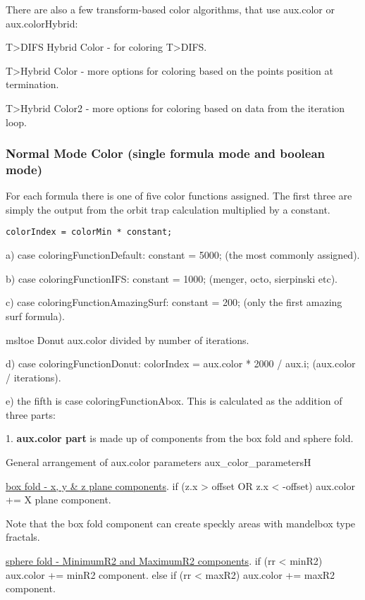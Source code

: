 There are also a few transform-based color algorithms, that use aux.color or aux.colorHybrid:

T>DIFS Hybrid Color - for coloring T>DIFS.

T>Hybrid Color - more options for coloring based on the points position at termination.

T>Hybrid Color2 - more options for coloring based on data from the iteration loop.

\subsubsection{Normal Mode Color (single formula mode and boolean mode)}\label{materials-normal-mode-color}

For each formula there is one of five color functions assigned. The first three are simply the output from the orbit trap calculation multiplied by a constant.

\begin{lstlisting}
colorIndex = colorMin * constant;
\end{lstlisting}
	

a) case coloringFunctionDefault: constant = 5000; (the most commonly assigned).

b) case coloringFunctionIFS: constant = 1000; (menger, octo, sierpinski etc).

c) case coloringFunctionAmazingSurf: constant = 200; (only the first amazing surf formula).

msltoe Donut aux.color divided by number of iterations.

d) case coloringFunctionDonut: colorIndex = aux.color * 2000 / aux.i; (aux.color /  iterations).

e) the fifth is case coloringFunctionAbox. This is calculated as the addition of three parts:

1. \textbf{aux.color part} is made up of components from the box fold and sphere fold.

{General arrangement of aux.color parameters}
{aux_color_parameters}{H}

\underline{box fold -  x, y \& z plane components}.
if  (z.x  >  offset  OR  z.x  <  -offset)   aux.color +=  X plane component.

Note that the box fold component can create speckly areas with mandelbox type fractals.

\underline{sphere fold - MinimumR2 and MaximumR2 components}. 
if (rr < minR2)    aux.color +=  minR2 component.
else if (rr < maxR2)    aux.color +=  maxR2 component.

